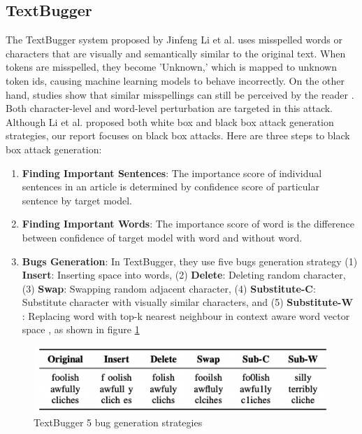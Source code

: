 \documentclass[%
	BCOR=8mm, %
	DIV=12,
	toc=bibliography, %
	toc=listof, %
	oneside, %
	egregdoesnotlikesansseriftitles, %
	]{scrbook}
\begin{document}
\subsection{TextBugger}
\label{subsection:textbugger}
The TextBugger system proposed by Jinfeng Li et al. \cite{li_textbugger_2019} uses misspelled words or characters that are visually and semantically similar to the original text. When tokens are misspelled, they become 'Unknown,' which is mapped to unknown token ids, causing machine learning models to behave incorrectly. On the other hand, studies show that similar misspellings can still be perceived by the reader \cite{rawlinson_significance_2007,alzantot_generating_2018}. Both character-level and word-level perturbation are targeted in this attack. Although Li et al.\cite{li_textbugger_2019}  proposed both white box and black box attack generation strategies, our report focuses on black box attacks. Here are three steps to black box attack generation:
\begin{enumerate}
    \item \textbf{Finding Important Sentences}: The importance score of individual sentences in an article is determined by confidence score of particular sentence by target model.
    \item \textbf{Finding Important Words}: The importance score of word is the difference between confidence of target model with word and without word.
    \item \textbf{Bugs Generation}: In TextBugger, they use five bugs generation strategy (1) \textbf{Insert}: Inserting space into words, (2) \textbf{Delete}: Deleting random character,
    (3) \textbf{Swap}: Swapping random adjacent character, (4) \textbf{Substitute-C}: Substitute character with visually similar characters, and (5)\textbf{ Substitute-W} : Replacing word with top-k nearest neighbour in context aware word vector space , as shown in figure \ref{diag:textbug}
\end{enumerate}

\begin{figure}[H]
    \centering
    \includegraphics[width=.7\textwidth]{img/textbugger_5strat.png}
    \caption[Example of 5 bug generation strategies of TextBugger]{TextBugger 5 bug generation strategies \cite{li_textbugger_2019} }
    \label{diag:textbug}
\end{figure}
\end{document}
